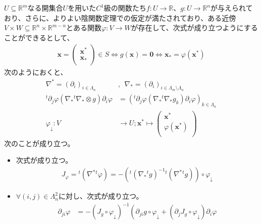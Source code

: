 \documentclass[dvipdfmx]{jsarticle}
\begin{document}
\begin{thm}\label{4.4.4.4}
$U \subseteq \mathbb{R}^{m}$なる開集合$U$を用いた$C^{1}$級の関数たち$f:U \rightarrow \mathbb{R}$、$g:U \rightarrow \mathbb{R}^{n}$が与えられており、さらに、よりよい陰関数定理での仮定が満たされており、ある近傍$V \times W \subseteq \mathbb{R}^{n} \times \mathbb{R}^{m - n}$とある関数$\varphi:V \rightarrow W$が存在して、次式が成り立つようにすることができるとして、
\begin{align*}
\mathbf{x} = \begin{pmatrix}
\mathbf{x}^{*} \\
\mathbf{x}_{*} \\
\end{pmatrix} \in S \Leftrightarrow g\left( \mathbf{x} \right) = \mathbf{0} \Leftrightarrow \mathbf{x}_{*} = \varphi\left( \mathbf{x}^{*} \right)
\end{align*}
次のようにおくと、
\begin{align*}
\nabla^{*} = \left( \partial_{i} \right)_{i \in \varLambda_{n}}&,\ \ \nabla_{*} = \left( \partial_{i} \right)_{i \in \varLambda_{m} \setminus \varLambda_{n}} \\
{}^t \partial_{j}\varphi\left( \nabla_{*}{}^t \nabla_{*} \otimes g \right)\partial_{i}\varphi &= \left({}^t \partial_{j}\varphi\left( \nabla_{*}{}^t \nabla_{*}g_{k} \right)\partial_{i}\varphi \right)_{k \in \varLambda_{n}} \\
\varphi_{\downarrow}:V &\rightarrow U;\mathbf{x}^{*} \mapsto \begin{pmatrix}
\mathbf{x}^{*} \\
\varphi\left( \mathbf{x}^{*} \right) \\
\end{pmatrix}
\end{align*}
次のことが成り立つ。
\begin{itemize}
\item
  次式が成り立つ。
\begin{align*}
J_{\varphi} ={}^t \left( \nabla^{*}{}^t \varphi \right) = - \left({}^t \left( \nabla_{*}{}^{t}g \right)^{- 1}{}^{t}\left( \nabla^{*}{}^t g \right) \right) \circ \varphi_{\downarrow}
\end{align*}
\item
  $\forall(i,j) \in \varLambda_{n}^{2}$に対し、次式が成り立つ。
\begin{align*}
\partial_{ji}\varphi &= - \left( J_{g} \circ \varphi_{\downarrow} \right)^{- 1}\left( \partial_{ji}g \circ \varphi_{\downarrow} + \left( \partial_{j}J_{g} \circ \varphi_{\downarrow} \right)\partial_{i}\varphi \right. \\

\end{align*}
\end{itemize}
\end{thm}
\end{document}
